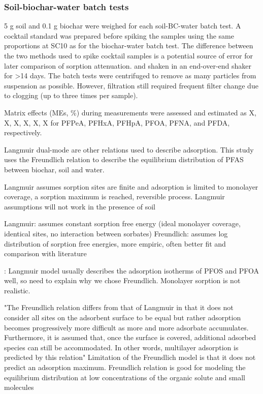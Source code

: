 \subsubsection{Soil-biochar-water batch tests}\label{sec:S-BC}
5 g soil and 0.1 g biochar were weighed for each soil-BC-water batch test. A cocktail standard was prepared before spiking the samples using the same proportions at SC10 as for the biochar-water batch test. The difference between the two methods used to spike cocktail samples is a potential source of error for later comparison of sorption attenuation. and shaken in an end-over-end shaker for \textgreater 14 days. The batch tests were centrifuged to remove as many particles from suspension as possible. However, filtration still required frequent filter change due to clogging (up to three times per sample).

Matrix effects (MEs, \%) during measurements were assessed and estimated as X, X, X, X, X, X for PFPeA, PFHxA, PFHpA, PFOA, PFNA, and PFDA, respectively.

Langmuir dual-mode are other relations used to describe adsorption. This study uses the Freundlich relation to describe the equilibrium distribution of PFAS between biochar, soil and water. 

Langmuir assumes sorption sites are finite and adsorption is limited to monolayer coverage, a sorption maximum is reached, reversible process. Langmuir assumptions will not work in the presence of soil

Langmuir: assumes constant sorption free energy (ideal monolayer coverage, identical sites, no interaction between sorbates)
Freundlich: assumes log distribution of sorption free energies, more empiric, often better fit and comparison with literature

\citep{du2014adsorption}: Langmuir model usually describes the adsorption isotherms of PFOS and PFOA well, so need to explain why we chose Freundlich. Monolayer sorption is not realistic. 

"The Freundlich relation differs from that of Langmuir in that it does not consider all sites on the adsorbent surface to be equal but rather adsorption becomes progressively more difficult as more and more adsorbate accumulates. Furthermore, it is assumed that, once the surface is covered, additional adsorbed species can still be accommodated. In other words, multilayer adsorption is predicted by this relation" \citep{vanloon2017Ch14}
Limitation of the Freundlich model is that it does not predict an adsorption maximum. 
Freundlich relation is good for modeling the equilibrium distribution at low concentrations of the organic solute and small molecules \citep{vanloon2017Ch14}

